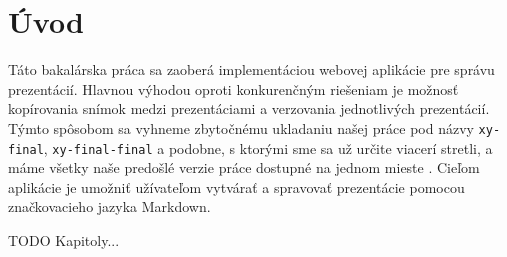 \chapter{Úvod}
Táto bakalárska práca sa zaoberá implementáciou webovej aplikácie pre správu prezentácií. Hlavnou výhodou oproti konkurenčným riešeniam je možnosť kopírovania snímok medzi prezentáciami a verzovania jednotlivých prezentácií. Týmto spôsobom sa vyhneme zbytočnému ukladaniu našej práce pod názvy \texttt{xy-final}, \texttt{xy-final-final} a podobne, s ktorými sme sa už určite viacerí stretli, a máme všetky naše predošlé verzie práce dostupné na jednom mieste . Cieľom aplikácie je umožniť užívateľom vytvárať a spravovať prezentácie pomocou značkovacieho jazyka Markdown.

TODO Kapitoly...

